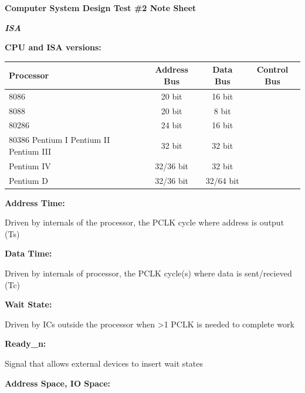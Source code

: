 \documentclass{article}
\newcommand{\ti}[1]{\hangindent=0.25in\noindent\begin{scriptsize}\textbf{#1:}\end{scriptsize}}
\newcommand{\chaptertitle}[1]{\noindent\begin{normalsize}\textit{\textbf{#1}}\end{normalsize}}
\newcommand{\hi}{\setlength\parindent{0.25in}\indent\hangindent=0.75in}
\begin{document}
	\begin{normalsize}
	\noindent \textbf{Computer System Design Test \#2 Note Sheet}
	\end{normalsize}
	
	\begin{scriptsize}
	\begin{multicols*}{2}
		
		\chaptertitle{ISA}
		
		\ti{CPU and ISA versions}
		
			\noindent \begin{tabular}{m{1.65cm}|c|c|c}
				Processor & Address Bus & Data Bus & Control Bus \\ \hline
				8086 & 20 bit & 16 bit & \\\hline
				8088 & 20 bit & 8 bit & \\\hline
				80286 & 24 bit & 16 bit & \\\hline
				80386 \newline 80486 \newline Pentium I \newline Pentium II \newline Pentium III& 32 bit & 32 bit & \\\hline
				Pentium IV & 32/36 bit & 32 bit & \\\hline
				Pentium D & 32/36 bit & 32/64 bit & \\\hline
			\end{tabular}
			
		\ti{Address Time} Driven by internals of the processor, the PCLK cycle where address is output (Ts)
		
		\ti{Data Time} Driven by internals of processor, the PCLK cycle(s) where data is sent/recieved (Tc)
		
		\ti{Wait State} Driven by ICs outside the processor when >1 PCLK is needed to complete work
		
			\hi \ti{Ready\_n} Signal that allows external devices to insert wait states
		
		\ti{Address Space, IO Space}
		

\end{multicols*}
\end{scriptsize}
\end{document}
